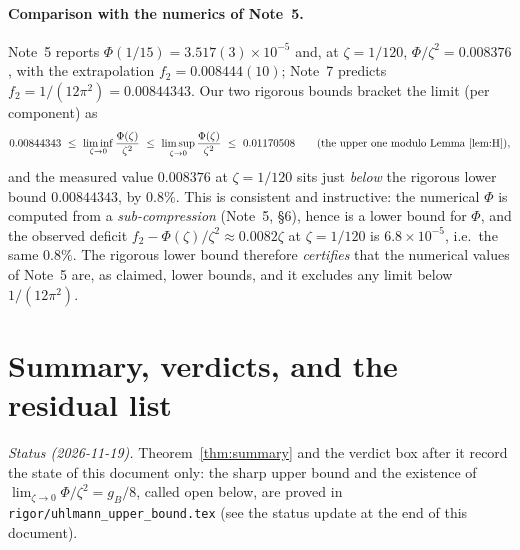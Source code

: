 \documentclass[11pt]{article}
\theoremstyle{definition}\newtheorem{problem}[theorem]{Problem}
\begin{document}
\paragraph{Comparison with the numerics of Note~5.}
Note~5 reports \(\Phi(1/15)=3.517(3)\times10^{-5}\) and, at \(\zeta=1/120\),
\(\Phi/\zeta^2=0.008376\), with the extrapolation \(f_2=0.008444(10)\); Note~7 predicts
\(f_2=1/(12\pi^2)=0.00844343\).  Our two rigorous bounds bracket the limit (per component) as
\[
 0.00844343\ \le\ \liminf_{\zeta\to0}\frac{\Phi(\zeta)}{\zeta^2}
 \ \le\ \limsup_{\zeta\to0}\frac{\Phi(\zeta)}{\zeta^2}\ \le\ 0.01170508
 \qquad\text{(the upper one modulo Lemma~\ref{lem:H})},
\]
and the measured value \(0.008376\) at \(\zeta=1/120\) sits just \emph{below} the rigorous lower
bound \(0.00844343\), by \(0.8\%\).  This is consistent and instructive: the numerical \(\Phi\) is
computed from a \emph{sub-compression} (Note~5, \S6), hence is a lower bound for \(\Phi\), and the
observed deficit \(f_2-\Phi(\zeta)/\zeta^2\approx0.0082\zeta\) at \(\zeta=1/120\) is
\(6.8\times10^{-5}\), i.e.\ the same \(0.8\%\).  The rigorous lower bound therefore \emph{certifies}
that the numerical values of Note~5 are, as claimed, lower bounds, and it excludes any limit below
\(1/(12\pi^2)\).

\section{Summary, verdicts, and the residual list}\label{sec:summary}

\emph{Status (2026-11-19).} Theorem~\ref{thm:summary} and the verdict box after it record the state of this
document only: the sharp upper bound and the existence of $\lim_{\zeta\to0}\Phi/\zeta^2=g_B/8$, called open below,
are proved in \texttt{rigor/uhlmann\_upper\_bound.tex} (see the status update at the end of this document).
\end{document}
